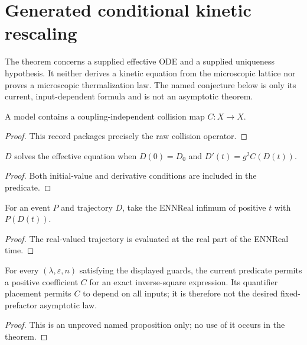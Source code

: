 
\chapter{Generated conditional kinetic rescaling}
\label{ch:ArchonPhysics_Generated_problem_kinetic_time_rescaling}

The theorem concerns a supplied effective ODE and a supplied uniqueness hypothesis. It neither derives a kinetic equation from the microscopic lattice nor proves a microscopic thermalization law. The named conjecture below is only its current, input-dependent formula and is not an asymptotic theorem.

\begin{definition}
\label{def:kinetic:model}
A model contains a coupling-independent collision map $C:X\to X$.
\end{definition}
\begin{proof}This record packages precisely the raw collision operator.\end{proof}

\begin{definition}
\label{def:kinetic:solution}
$D$ solves the effective equation when $D(0)=D_0$ and $D'(t)=g^2C(D(t))$.
\end{definition}
\begin{proof}Both initial-value and derivative conditions are included in the predicate.\end{proof}

\begin{definition}
\label{def:kinetic:first-hit}
For an event $P$ and trajectory $D$, take the ENNReal infimum of positive $t$ with $P(D(t))$.
\end{definition}
\begin{proof}The real-valued trajectory is evaluated at the real part of the ENNReal time.\end{proof}

\begin{definition}
\label{def:kinetic:microscopic-conjecture}
For every $(\lambda,\varepsilon,n)$ satisfying the displayed guards, the current predicate permits a positive coefficient $C$ for an exact inverse-square expression. Its quantifier placement permits $C$ to depend on all inputs; it is therefore not the desired fixed-prefactor asymptotic law.
\end{definition}
\begin{proof}This is an unproved named proposition only; no use of it occurs in the theorem.\end{proof}

